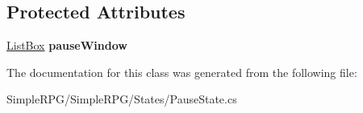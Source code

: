 \subsection*{Protected Attributes}
\begin{DoxyCompactItemize}
\item 
\hypertarget{class_simple_r_p_g_1_1_states_1_1_pause_state_a5ca649a458e41330e32f5f4cc68fc66e}{\hyperlink{class_simple_r_p_g_1_1_windows_1_1_list_box}{List\-Box} {\bfseries pause\-Window}}\label{class_simple_r_p_g_1_1_states_1_1_pause_state_a5ca649a458e41330e32f5f4cc68fc66e}

\end{DoxyCompactItemize}


The documentation for this class was generated from the following file\-:\begin{DoxyCompactItemize}
\item 
Simple\-R\-P\-G/\-Simple\-R\-P\-G/\-States/Pause\-State.\-cs\end{DoxyCompactItemize}
